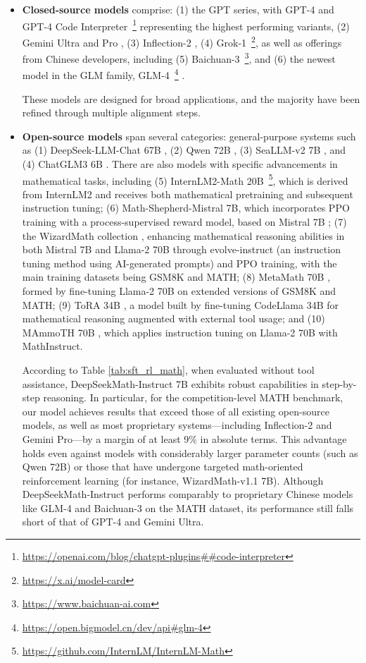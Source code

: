\begin{itemize}[topsep=0pt]
    \item \textbf{Closed-source models} comprise: (1) the GPT series, with GPT-4 \citep{gpt4} and GPT-4 Code Interpreter~\footnote{\url{https://openai.com/blog/chatgpt-plugins\#\#code-interpreter}} representing the highest performing variants, (2) Gemini Ultra and Pro \citep{gemini}, (3) Inflection-2 \citep{inflection-2}, (4) Grok-1~\footnote{\url{https://x.ai/model-card}}, as well as offerings from Chinese developers, including (5) Baichuan-3~\footnote{\url{https://www.baichuan-ai.com}}, and (6) the newest model in the GLM family, GLM-4~\footnote{\url{https://open.bigmodel.cn/dev/api\#glm-4}} \citep{glm}.

These models are designed for broad applications, and the majority have been refined through multiple alignment steps.

\item \textbf{Open-source models} span several categories: general-purpose systems such as (1) DeepSeek-LLM-Chat 67B \citep{deepseek-llm}, (2) Qwen 72B \citep{qwen}, (3) SeaLLM-v2 7B \citep{seallm}, and (4) ChatGLM3 6B \citep{chatglm3}. There are also models with specific advancements in mathematical tasks, including (5) InternLM2-Math 20B~\footnote{\url{https://github.com/InternLM/InternLM-Math}}, which is derived from InternLM2 and receives both mathematical pretraining and subsequent instruction tuning; (6) Math-Shepherd-Mistral 7B, which incorporates PPO training \citep{schulman2017proximal} with a process-supervised reward model, based on Mistral 7B \citep{mistral}; (7) the WizardMath collection \citep{wizardmath}, enhancing mathematical reasoning abilities in both Mistral 7B and Llama-2 70B \citep{llama2} through evolve-instruct (an instruction tuning method using AI-generated prompts) and PPO training, with the main training datasets being GSM8K and MATH; (8) MetaMath 70B \citep{metamath}, formed by fine-tuning Llama-2 70B on extended versions of GSM8K and MATH; (9) ToRA 34B \cite{tora}, a model built by fine-tuning CodeLlama 34B for mathematical reasoning augmented with external tool usage; and (10) MAmmoTH 70B \citep{MathInstruct}, which applies instruction tuning on Llama-2 70B with MathInstruct.

According to Table \ref{tab:sft_rl_math}, when evaluated without tool assistance, DeepSeekMath-Instruct 7B exhibits robust capabilities in step-by-step reasoning. In particular, for the competition-level MATH benchmark, our model achieves results that exceed those of all existing open-source models, as well as most proprietary systems—including Inflection-2 and Gemini Pro—by a margin of at least 9\% in absolute terms. This advantage holds even against models with considerably larger parameter counts (such as Qwen 72B) or those that have undergone targeted math-oriented reinforcement learning (for instance, WizardMath-v1.1 7B). Although DeepSeekMath-Instruct performs comparably to proprietary Chinese models like GLM-4 and Baichuan-3 on the MATH dataset, its performance still falls short of that of GPT-4 and Gemini Ultra.


\end{itemize}
